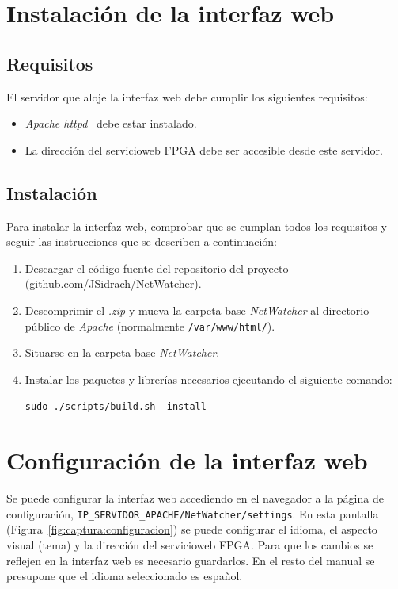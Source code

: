 \section{Instalación de la interfaz web\label{extra:manual:instalacionweb}}

\subsection*{Requisitos}
El servidor que aloje la interfaz web debe cumplir los siguientes requisitos:
\begin{itemize}
  \item \textit{Apache httpd}~\cite{httpd} debe estar instalado.
  \item La dirección del \gls{servicioweb} \gls{FPGA} debe ser accesible desde este servidor.
\end{itemize}

\subsection*{Instalación}
Para instalar la interfaz web, comprobar que se cumplan todos los requisitos y seguir las instrucciones que se describen a continuación:
\begin{enumerate}
  \item Descargar el código fuente del repositorio del proyecto (\href{https://github.com/JSidrach/NetWatcher/archive/master.zip}{\footnotesize{github.com/JSidrach/NetWatcher}}).
  \item Descomprimir el \textit{.zip} y mueva la carpeta base \textit{NetWatcher} al directorio público de \textit{Apache} (normalmente \texttt{/var/www/html/}).
  \item Situarse en la carpeta base \textit{NetWatcher}.
  \item Instalar los paquetes y librerías necesarios ejecutando el siguiente comando:

  \texttt{sudo ./scripts/build.sh --install}
\end{enumerate}


\section{Configuración de la interfaz web\label{extra:manual:configweb}}

Se puede configurar la interfaz web accediendo en el navegador a la página de configuración, \texttt{IP\_SERVIDOR\_APACHE/NetWatcher/settings}.
En esta pantalla (Figura~\ref{fig:captura:configuracion}) se puede configurar el idioma, el aspecto visual (tema) y la dirección del \gls{servicioweb} \gls{FPGA}.
Para que los cambios se reflejen en la interfaz web es necesario guardarlos. En el resto del manual se presupone que el idioma seleccionado es español.

